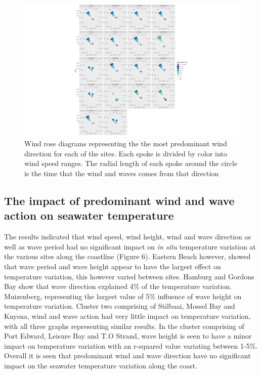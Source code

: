 \documentclass[12pt,a4paper,]{article}
\begin{document}
\begin{figure}
\centering
\includegraphics{../figures/p.wr3.pdf}
\caption{Wind rose diagrams representing the the most predominant wind
direction for each of the sites. Each spoke is divided by color into
wind speed ranges. The radial length of each spoke around the circle is
the time that the wind and waves comes from that direction}
\end{figure}

\hypertarget{the-impact-of-predominant-wind-and-wave-action-on-seawater-temperature}{%
\subsection{The impact of predominant wind and wave action on seawater
temperature}\label{the-impact-of-predominant-wind-and-wave-action-on-seawater-temperature}}

The results indicated that wind speed, wind height, wind and wave
direction as well as wave period had no significant impact on \emph{in
situ} temperature variation at the various sites along the coastline
(Figure 6). Eastern Beach however, showed that wave period and wave
height appear to have the largest effect on temperature variation, this
however varied between sites. Hamburg and Gordons Bay show that wave
direction explained 4\% of the temperature variation. Muizenberg,
representing the largest value of 5\% influence of wave height on
temperature variation. Cluster two comprising of Stilbaai, Mossel Bay
and Knysna, wind and wave action had very little impact on temperature
variation, with all three graphs representing similar results. In the
cluster comprising of Port Edward, Leisure Bay and T.O Strand, wave
height is seen to have a minor impact on temperature variation with an
r-squared value variating between 1-5\%. Overall it is seen that
predominant wind and wave direction have no significant impact on the
seawater temperature variation along the coast.
\end{document}
